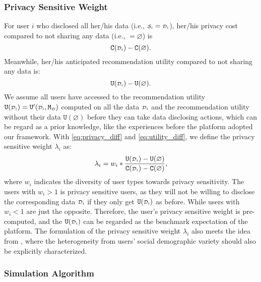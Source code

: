 \subsubsection{\textbf{Privacy Sensitive Weight}}
\label{sec:user_type}
For user $i$ who disclosed all her/his data (i.e., ${\scriptstyle \mathcal{S}_i} = {\scriptstyle \mathcal{D}_i}$), her/his privacy cost compared to not sharing any data (i.e., $\si{} = \varnothing $) is 
\begin{equation}
    \texttt{C}({\scriptstyle \mathcal{D}_i}) - \texttt{C}(\varnothing).
\label{eq:privacy_diff}
\end{equation}
Meanwhile, her/his anticipated recommendation utility compared to not sharing any data is:
\begin{equation}
    \texttt{U}({\scriptstyle \mathcal{D}_i}) - \texttt{U}(\varnothing).
\label{eq:utility_diff}
\end{equation}
We assume all users have accessed to the recommendation utility $\texttt{U}({\scriptstyle \mathcal{D}_i})=\texttt{U}'({\scriptstyle \mathcal{D}_i},\texttt{M}_{{\scriptscriptstyle \mathcal{D}}})$ computed on all the data ${\scriptstyle \mathcal{D}_i}$ and the recommendation utility without their data $\texttt{U}(\varnothing)$ before they can take data disclosing actions, which can be regard as a prior knowledge, like the experiences before the platform adopted our framework.
With \cref{eq:privacy_diff} and \cref{eq:utility_diff}, we define the privacy sensitive weight $\lambda_i$ as: 
\begin{equation}
    \lambda_i = w_i  * \frac{\texttt{U}({\scriptstyle \mathcal{D}_i})  - \texttt{U}(\varnothing) } {  \texttt{C}({\scriptstyle \mathcal{D}_i}) - \texttt{C}(\varnothing) },
    \label{marginal_define}
\end{equation}
where $w_i$ indicates the diversity of user types towards privacy sensitivity.
The users with $w_i > 1$ is privacy sensitive users, as they will not be willing to disclose the corresponding data ${\scriptstyle \mathcal{D}_i}$ if they only get $\texttt{U}({\scriptstyle \mathcal{D}_i})$ as before.
While users  with $w_i < 1$ are just the opposite. %
Therefore, the user's privacy sensitive weight is pre-computed, and the $\texttt{U}({\scriptstyle \mathcal{D}_i})$ can be regarded as the benchmark expectation of the platform.
The formulation of the privacy sensitive weight $\lambda_i$ also meets the idea from \cite{lin2019valuing}, where the heterogeneity from users' social demographic variety should also be explicitly characterized. %



\subsubsection{\textbf{Simulation Algorithm}}

